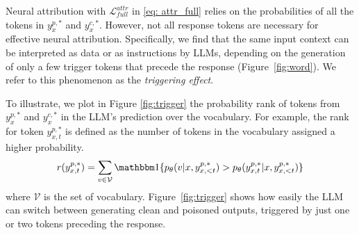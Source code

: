 Neural attribution with $\mathcal L^{attr}_{full}$ in \eqref{eq: attr_full} relies on the probabilities of all the tokens in $y_x^{p,*}$ and $y_x^{c,*}$.
However, not all response tokens are necessary for effective neural attribution.
Specifically, we find that the same input context can be interpreted as data or as instructions by LLMs, depending on the generation of only a few trigger tokens that precede the response (Figure~\ref{fig:word}).
We refer to this phenomenon as the \textit{triggering effect}.


To illustrate, we plot in Figure \ref{fig:trigger} the probability rank of tokens from $y_x^{p,*}$ and $y_x^{c,*}$ in the LLM's prediction over the vocabulary. 
For example, the rank for token $y_{x,t}^{p,*}$ is defined as the number of tokens in the vocabulary assigned a higher probability.
%
\begin{equation}
    r(y_{x,t}^{p,*}) = \sum_{v\in\mathcal V} \mathbbm 1\{p_\theta(v|x,y_{x,<t}^{p,*})>p_\theta(y_{x,t}^{p,*}|x,y_{x,<t}^{p,*})\}
\end{equation}
%
where $\mathcal V$ is the set of vocabulary.
Figure~\ref{fig:trigger} shows how easily the LLM can switch between generating clean and poisoned outputs, triggered by just one or two tokens preceding the response.


